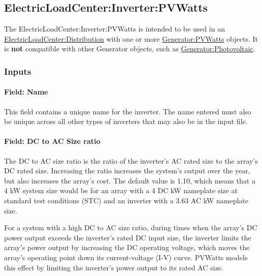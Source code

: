 \subsection{ElectricLoadCenter:Inverter:PVWatts}\label{electricloadcenterinverterpvwatts}

The ElectricLoadCenter:Inverter:PVWatts is intended to be used in an \hyperref[electricloadcenterdistribution]{ElectricLoadCenter:Distribution} with one or more \hyperref[generatorpvwatts]{Generator:PVWatts} objects. It is \textbf{not} compatible with other Generator objects, such as \hyperref[generatorphotovoltaic-000]{Generator:Photovoltaic}.

\subsubsection{Inputs}\label{inputs-electricloadcenterinverterpvwatts}

\paragraph{Field: Name}\label{field-name-electricloadcenterinverterpvwatts}

This field contains a unique name for the inverter. The name entered
must also be unique across all other types of inverters that may also be
in the input file.

\paragraph{Field: DC to AC Size ratio}\label{field-dc-to-ac-size-ratio-electricloadcenterinverterpvwatts}

The DC to AC size ratio is the ratio of the inverter's AC rated size to
the array's DC rated size. Increasing the ratio increases the system's
output over the year, but also increases the array's cost. The default
value is 1.10, which means that a 4 kW system size would be for an array
with a 4 DC kW nameplate size at standard test conditions (STC) and an
inverter with a 3.63 AC kW nameplate size.

For a system with a high DC to AC size ratio, during times when the
array's DC power output exceeds the inverter's rated DC input size, the
inverter limits the array's power output by increasing the DC operating
voltage, which moves the array's operating point down its
current-voltage (I-V) curve. PVWatts models this effect by limiting the
inverter's power output to its rated AC size.

